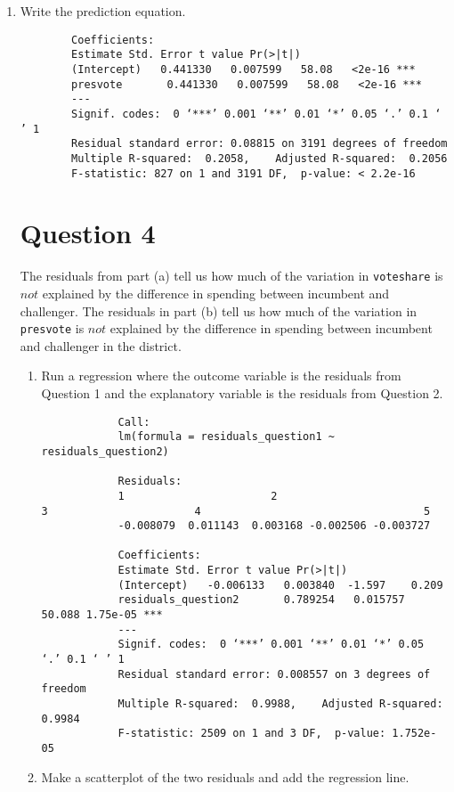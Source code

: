 \documentclass[12pt,letterpaper]{article}
\begin{document}
\begin{enumerate}
			\vspace{0.05cm}
		\item Write the prediction equation.

					\begin{verbatim}		
		Coefficients:
		Estimate Std. Error t value Pr(>|t|)    
		(Intercept)   0.441330   0.007599   58.08   <2e-16 ***
		presvote       0.441330   0.007599   58.08   <2e-16 ***
		---
		Signif. codes:  0 ‘***’ 0.001 ‘**’ 0.01 ‘*’ 0.05 ‘.’ 0.1 ‘ ’ 1
		Residual standard error: 0.08815 on 3191 degrees of freedom
		Multiple R-squared:  0.2058,	Adjusted R-squared:  0.2056 
		F-statistic: 827 on 1 and 3191 DF,  p-value: < 2.2e-16
	\end{verbatim}

\section*{Question 4}
\noindent The residuals from part (a) tell us how much of the variation in \texttt{voteshare} is $not$ explained by the difference in spending between incumbent and challenger. The residuals in part (b) tell us how much of the variation in \texttt{presvote} is $not$ explained by the difference in spending between incumbent and challenger in the district.
	\begin{enumerate}
		\item Run a regression where the outcome variable is the residuals from Question 1 and the explanatory variable is the residuals from Question 2.	\vspace{0.05cm}
		
			\begin{verbatim}
			Call:
			lm(formula = residuals_question1 ~ residuals_question2)
			
			Residuals:
			1			        	2   											3       				4      								5  
			-0.008079  0.011143  0.003168 -0.002506 -0.003727  
			
			Coefficients:
			Estimate Std. Error t value Pr(>|t|)    
			(Intercept)   -0.006133   0.003840  -1.597    0.209 
			residuals_question2       0.789254   0.015757  50.088 1.75e-05 ***
			---
			Signif. codes:  0 ‘***’ 0.001 ‘**’ 0.01 ‘*’ 0.05 ‘.’ 0.1 ‘ ’ 1
			Residual standard error: 0.008557 on 3 degrees of freedom
			Multiple R-squared:  0.9988,	Adjusted R-squared:  0.9984 
			F-statistic: 2509 on 1 and 3 DF,  p-value: 1.752e-05
		\end{verbatim}
		
		\item Make a scatterplot of the two residuals and add the regression line. 	\vspace{0.05cm}
		

\end{enumerate}
\end{enumerate}
\end{document}
